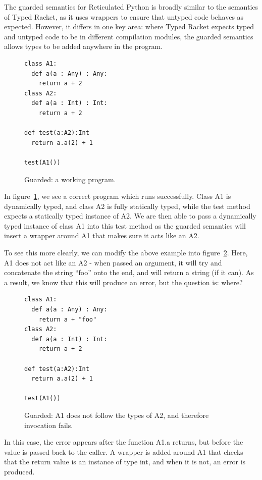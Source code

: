 \documentclass[preprint]{sigplanconf}
\begin{document}
The guarded semantics for Reticulated Python is broadly similar to the semantics of
Typed Racket, as it uses wrappers to ensure that untyped code behaves as expected. 
However, it differs in one key area: where Typed Racket expects typed and untyped 
code to be in different compilation modules, the guarded semantics allows types
to be added anywhere in the program.

\begin{figure}[h]
\begin{verbatim}
class A1:
  def a(a : Any) : Any:
    return a + 2
class A2:
  def a(a : Int) : Int:
    return a + 2

def test(a:A2):Int
  return a.a(2) + 1

test(A1())
\end{verbatim}
\caption{Guarded: a working program.}
\label{fig:guard1}
\end{figure}

In figure~\ref{fig:guard1}, we see a correct program which runs successfully. Class A1
is dynamically typed, and class A2 is fully statically typed, while the test method
expects a statically typed instance of A2. We are then able to pass a dynamically typed
instance of class A1 into this test method as the guarded semantics will insert a wrapper
around A1 that makes sure it acts like an A2.

To see this more clearly, we can modify the above example into figure~\ref{fig:guard2}. Here,
A1 does not act like an A2 - when passed an argument, it will try and concatenate the string
``foo'' onto the end, and will return a string (if it can). As a result, we know that this will
produce an error, but the question is: where?

\begin{figure}[h]
\begin{verbatim}
class A1:
  def a(a : Any) : Any:
    return a + "foo"
class A2:
  def a(a : Int) : Int:
    return a + 2

def test(a:A2):Int
  return a.a(2) + 1

test(A1())
\end{verbatim}
\caption{Guarded: A1 does not follow the types of A2, and therefore invocation fails.}
\label{fig:guard2}
\end{figure}

In this case, the error appears after the function A1.a returns, but before the value is passed
back to the caller. A wrapper is added around A1 that checks that the return value is an instance
of type int, and when it is not, an error is produced.
\end{document}
